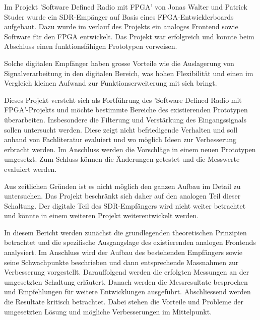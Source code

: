 Im Projekt 'Software Defined Radio mit FPGA' von Jonas Walter und Patrick Studer wurde ein SDR-Empänger auf Basis eines FPGA-Entwicklerboards aufgebaut. Dazu wurde im verlauf des Projekts ein analoges Frontend sowie Software für den FPGA entwickelt. Das Projekt war erfolgreich und konnte beim Abschluss einen funktionsfähigen Prototypen vorweisen.

Solche digitalen Empfänger haben grosse Vorteile wie die Auslagerung von Signalverarbeitung in den digitalen Bereich, was hohen Flexibilität und einen im Vergleich kleinen Aufwand zur Funktionserweiterung mit sich bringt.

Dieses Projekt versteht sich als Fortführung des 'Software Defined Radio mit FPGA'-Projekts und möchte bestimmte Bereiche des existierenden Prototypen überarbeiten. Insbesondere die Filterung und Verstärkung des Eingangssignals sollen untersucht werden. Diese zeigt nicht befriedigende Verhalten und soll anhand von Fachliteratur evaluiert und wo möglich Ideen zur Verbesserung erbracht werden. Im Anschluss werden die Vorschläge in einem neuen Prototypen umgesetzt. Zum Schluss können die Änderungen getestet und die Messwerte evaluiert werden.

Aus zeitlichen Gründen ist es nicht möglich den ganzen Aufbau im Detail zu untersuchen. Das Projekt beschränkt sich daher auf den analogen Teil dieser Schaltung. Der digitale Teil des SDR-Empfängers wird nicht weiter betrachtet und könnte in einem weiteren Projekt weiterentwickelt werden.

In diesem Bericht werden zunächst die grundlegenden theoretischen Prinzipien betrachtet und die spezifische Ausgangslage des existierenden analogen Frontends analysiert.
Im Anschluss wird der Aufbau des bestehenden Empfängers sowie seine Schwachpunkte beschrieben und dann entsprechende Massnahmen zur Verbesserung vorgestellt. Darauffolgend werden die erfolgten Messungen an der umgesetzten Schaltung erläutert. Danach werden die Messresultate besprochen und Empfehlungen für weitere Entwicklungen ausgeführt. Abschliessend werden die Resultate kritisch betrachtet. Dabei stehen die Vorteile und Probleme der umgesetzten Lösung und mögliche Verbesserungen im Mittelpunkt.
